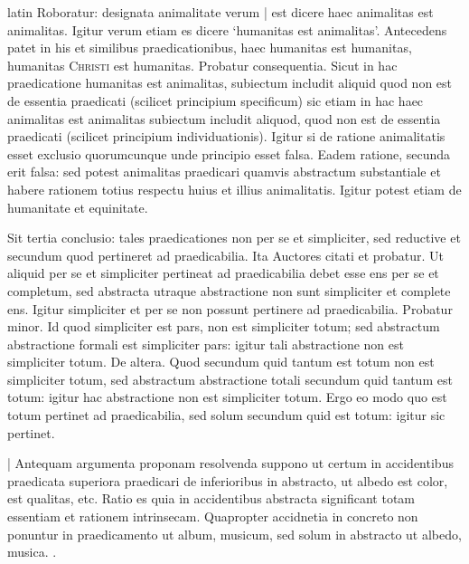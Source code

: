 \begin{otherlanguage*}{latin}
\pstart
  Roboratur: designata animalitate verum \textnormal{|} est dicere haec animalitas est animalitas. Igitur verum etiam es dicere `humanitas est animalitas'. Antecedens patet in his et similibus praedicationibus, haec humanitas est humanitas, humanitas \textsc{Christi} est humanitas. Probatur consequentia. Sicut in hac praedicatione humanitas est animalitas, subiectum includit aliquid quod non est de essentia praedicati (scilicet principium specificum) sic etiam in hac haec animalitas est animalitas subiectum includit aliquod, quod non est de essentia praedicati (scilicet principium individuationis). Igitur si de ratione animalitatis esset exclusio quorumcunque unde principio esset falsa. Eadem ratione, secunda erit falsa: sed potest animalitas praedicari quamvis abstractum substantiale et habere rationem totius respectu huius et illius animalitatis. Igitur potest etiam de humanitate et equinitate. 
\pend

\pstart
  Sit tertia conclusio: tales praedicationes non per se et simpliciter, sed reductive et secundum quod pertineret ad praedicabilia. Ita Auctores citati et probatur. Ut aliquid per se et simpliciter pertineat ad praedicabilia debet esse ens per se et completum, sed abstracta utraque abstractione non sunt simpliciter et complete ens. Igitur simpliciter et per se non possunt pertinere ad praedicabilia. Probatur minor. Id quod simpliciter est pars, non est simpliciter totum; sed abstractum abstractione formali est simpliciter pars: igitur tali abstractione non est simpliciter totum. De altera. Quod secundum quid tantum est totum non est simpliciter totum, sed abstractum abstractione totali secundum quid tantum est totum: igitur hac abstractione non est simpliciter totum. Ergo eo modo quo est totum pertinet ad praedicabilia, sed solum secundum quid est totum: igitur sic pertinet. 
\pend

\pstart
  \textnormal{|}   Antequam argumenta proponam resolvenda suppono ut certum in accidentibus praedicata superiora praedicari de inferioribus in abstracto, ut albedo est color, est qualitas, etc. Ratio es quia in accidentibus abstracta significant totam essentiam et rationem intrinsecam. Quapropter accidnetia in concreto non ponuntur in praedicamento ut album, musicum, sed solum in abstracto ut albedo, musica. . 
\pend


\end{otherlanguage*}

